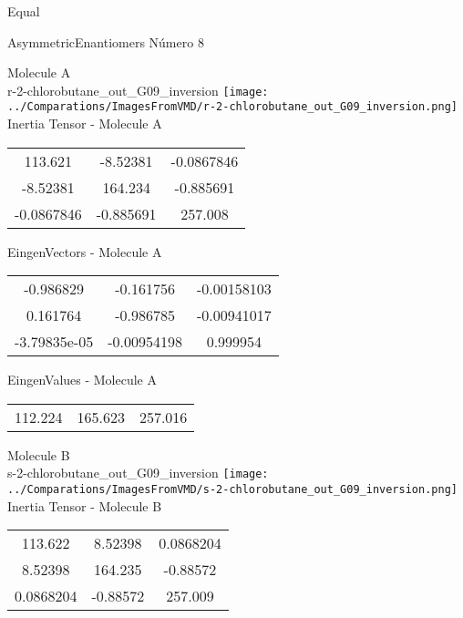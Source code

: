 \begin{center}
\vtab
\vtab
\textcolor{NavyBlue}{\Large Equal}
\end{center}

 \newpage

\vtab[-2cm]
\begin{center}
{\large AsymmetricEnantiomers \tab Número 8}
\end{center}
\begin{multicols}{2}
\begin{center}

Molecule A \\ 
r-2-chlorobutane\_out\_G09\_inversion
\texttt{[image: ../Comparations/ImagesFromVMD/r-2-chlorobutane\_out\_G09\_inversion.png]}
\\
Inertia Tensor - Molecule A \\
\vtab

\begin{tabular}{|c c c|}
113.621	 & 	-8.52381	 & 	-0.0867846	 \\
-8.52381	 & 	164.234	 & 	-0.885691	 \\
-0.0867846	 & 	-0.885691	 & 	257.008
\end{tabular}

\vtab
 EingenVectors - Molecule A     \\
\vtab
\begin{tabular}{|c c c|}
-0.986829	 & 	-0.161756	 & 	-0.00158103	 \\
0.161764	 & 	-0.986785	 & 	-0.00941017	 \\
-3.79835e-05	 & 	-0.00954198	 & 	0.999954
\end{tabular}

\vtab
 EingenValues - Molecule A     \\
\vtab
\begin{tabular}{|c c c|}
112.224	 & 	165.623	 & 	257.016	 \\
\end{tabular}
\columnbreak

Molecule B \\ 
s-2-chlorobutane\_out\_G09\_inversion
\texttt{[image: ../Comparations/ImagesFromVMD/s-2-chlorobutane\_out\_G09\_inversion.png]}
\\
Inertia Tensor - Molecule B \\
\vtab

\begin{tabular}{|c c c|}
113.622	 & 	8.52398	 & 	0.0868204	 \\
8.52398	 & 	164.235	 & 	-0.88572	 \\
0.0868204	 & 	-0.88572	 & 	257.009
\end{tabular}


\end{center}
\end{multicols}
